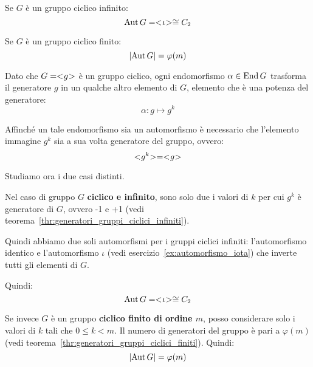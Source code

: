 \begin{teorema}
	\label{thr:automorfismi_gruppi_ciclici}
	Se $G$ è un gruppo ciclico infinito:
	\begin{equation*}
		\operatorname{Aut} G = < \negmedspace \iota \negmedspace > \cong C_2
	\end{equation*}

	Se $G$ è un gruppo ciclico finito:
	\begin{equation*}
		\lvert \operatorname{Aut} G \rvert = \varphi(m)
	\end{equation*}
\end{teorema}
\begin{dimostrazione}
	Dato che $G = < \negmedspace g \negmedspace >$ è un gruppo ciclico, ogni endomorfismo $\alpha \in \operatorname{End} G$ trasforma il generatore $g$ in un qualche altro elemento di $G$, elemento che è una potenza del generatore:
	\begin{equation*}
		\alpha: g \longmapsto g^k
	\end{equation*}

	Affinché un tale endomorfismo sia un automorfismo è necessario che l'elemento immagine $g^k$ sia a sua volta generatore del gruppo, ovvero:
	\begin{equation*}
		< \negmedspace g^k \negmedspace > = < \negmedspace g \negmedspace >
	\end{equation*}

	Studiamo ora i due casi distinti.
	
	Nel caso di gruppo $G$ \textbf{ciclico e infinito}, sono solo due i valori di $k$ per cui $g^k$ è generatore di $G$, ovvero -1 e +1 (vedi teorema~\ref{thr:generatori_gruppi_ciclici_infiniti}).
	
	Quindi abbiamo due soli automorfismi per i gruppi ciclici infiniti: l'automorfismo identico e l'automorfismo $\iota$ (vedi esercizio~\ref{ex:automorfismo_iota}) che inverte tutti gli elementi di $G$.
	
	Quindi:
	\begin{equation*}
		\operatorname{Aut} G = < \negmedspace \iota \negmedspace > \cong C_2
	\end{equation*}

	Se invece $G$ è un gruppo \textbf{ciclico finito di ordine $m$}, posso considerare solo i valori di $k$ tali che $0 \le k < m$. Il numero di generatori del gruppo è pari a $\varphi(m)$ (vedi teorema~\ref{thr:generatori_gruppi_ciclici_finiti}). Quindi:
	\begin{equation*}
		\lvert \operatorname{Aut} G \rvert = \varphi(m)
	\end{equation*}
\end{dimostrazione}

